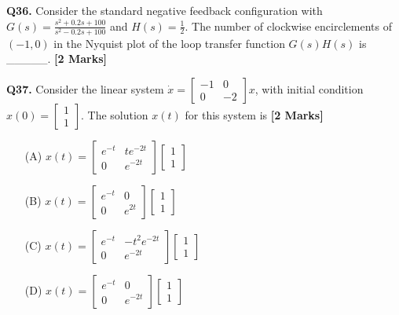 \documentclass[11pt]{article}
\newcommand{\questionb}[2]{
    \noindent\textbf{Q#2.} #1 \hfill \textbf{[2 Marks]}
}
\begin{document}
\questionb{Consider the standard negative feedback configuration with \(G(s) = \frac{s^2 + 0.2s + 100}{s^2 - 0.2s + 100}\) and \(H(s) = \frac{1}{2}\). The number of clockwise encirclements of \((-1, 0)\) in the Nyquist plot of the loop transfer function \(G(s)H(s)\) is \_\_\_\_\_.}{36}
\vspace{0.5cm}

\questionb{Consider the linear system \(\dot{x} = \begin{bmatrix} -1 & 0 \\ 0 & -2 \end{bmatrix}x\), with initial condition \(x(0) = \begin{bmatrix} 1 \\ 1 \end{bmatrix}\). The solution \(x(t)\) for this system is}{37}
\begin{enumerate}
    \item[(A)] \(x(t) = \begin{bmatrix} e^{-t} & te^{-2t} \\ 0 & e^{-2t} \end{bmatrix} \begin{bmatrix} 1 \\ 1 \end{bmatrix}\)
    \item[(B)] \(x(t) = \begin{bmatrix} e^{-t} & 0 \\ 0 & e^{2t} \end{bmatrix} \begin{bmatrix} 1 \\ 1 \end{bmatrix}\)
    \item[(C)] \(x(t) = \begin{bmatrix} e^{-t} & -t^2 e^{-2t} \\ 0 & e^{-2t} \end{bmatrix} \begin{bmatrix} 1 \\ 1 \end{bmatrix}\)
    \item[(D)] \(x(t) = \begin{bmatrix} e^{-t} & 0 \\ 0 & e^{-2t} \end{bmatrix} \begin{bmatrix} 1 \\ 1 \end{bmatrix}\)
\end{enumerate}
\vspace{0.5cm}
\end{document}
